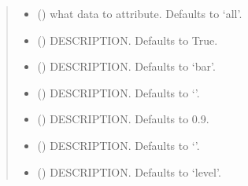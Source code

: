\documentclass[letterpaper,10pt,english]{sphinxmanual}
\begin{document}
\begin{fulllineitems}
\begin{fulllineitems}
\begin{quote}
\begin{description}
\begin{itemize}
\item {} 
\sphinxAtStartPar
{} (\sphinxstyleliteralemphasis{\sphinxupquote{|}}\sphinxstyleliteralemphasis{\sphinxupquote{|}}\sphinxstyleliteralemphasis{\sphinxupquote{|}}\sphinxstyleliteralemphasis{\sphinxupquote{, }}) \textendash{} what data to attribute. Defaults to ‘all’.

\item {} 
\sphinxAtStartPar
{} (\sphinxstyleliteralemphasis{\sphinxupquote{, }}) \textendash{} DESCRIPTION. Defaults to True.

\item {} 
\sphinxAtStartPar
{} (\sphinxstyleliteralemphasis{\sphinxupquote{, }}) \textendash{} DESCRIPTION. Defaults to ‘bar’.

\item {} 
\sphinxAtStartPar
{} (\sphinxstyleliteralemphasis{\sphinxupquote{, }}) \textendash{} DESCRIPTION. Defaults to ‘’.

\item {} 
\sphinxAtStartPar
{} (\sphinxstyleliteralemphasis{\sphinxupquote{, }}) \textendash{} DESCRIPTION. Defaults to 0.9.

\item {} 
\sphinxAtStartPar
{} (\sphinxstyleliteralemphasis{\sphinxupquote{, }}) \textendash{} DESCRIPTION. Defaults to ‘’.

\item {} 
\sphinxAtStartPar
{} (\sphinxstyleliteralemphasis{\sphinxupquote{, }}) \textendash{} DESCRIPTION. Defaults to ‘level’.


\end{itemize}
\end{description}
\end{quote}
\end{fulllineitems}
\end{fulllineitems}
\end{document}
